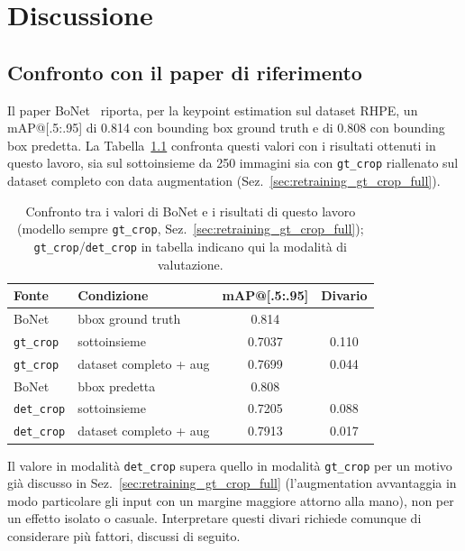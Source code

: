 \chapter{Discussione}
\label{chap:discussione}

\section{Confronto con il paper di riferimento}

Il paper BoNet~\cite{escobar2019bonet} riporta, per la keypoint
estimation sul dataset RHPE, un mAP@[.5:.95] di 0.814 con bounding box
ground truth e di 0.808 con bounding box predetta. La
Tabella~\ref{tab:confronto_bonet} confronta questi valori con i
risultati ottenuti in questo lavoro, sia sul sottoinsieme da 250
immagini sia con \texttt{gt\_crop} riallenato sul dataset completo con
data augmentation (Sez.~\ref{sec:retraining_gt_crop_full}).

\begin{table}[H]
\centering
\caption{Confronto tra i valori di BoNet e i risultati di questo lavoro
(modello sempre \texttt{gt\_crop}, Sez.~\ref{sec:retraining_gt_crop_full});
\texttt{gt\_crop}/\texttt{det\_crop} in tabella indicano qui la
modalità di valutazione.}
\label{tab:confronto_bonet}
\smallskip
\small
\begin{tabular}{llcc}
\toprule
Fonte & Condizione & mAP@[.5:.95] & Divario \\
\midrule
BoNet & bbox ground truth & 0.814 & \\
\texttt{gt\_crop} & sottoinsieme & 0.7037 & 0.110 \\
\texttt{gt\_crop} & dataset completo + aug & 0.7699 & 0.044 \\
\midrule
BoNet & bbox predetta & 0.808 & \\
\texttt{det\_crop} & sottoinsieme & 0.7205 & 0.088 \\
\texttt{det\_crop} & dataset completo + aug & 0.7913 & 0.017 \\
\bottomrule
\end{tabular}
\end{table}

Il valore in modalità \texttt{det\_crop} supera quello in modalità
\texttt{gt\_crop} per un motivo già discusso in
Sez.~\ref{sec:retraining_gt_crop_full} (l'augmentation avvantaggia in
modo particolare gli input con un margine maggiore attorno alla mano),
non per un effetto isolato o casuale. Interpretare questi divari
richiede comunque di considerare più fattori, discussi di seguito.

